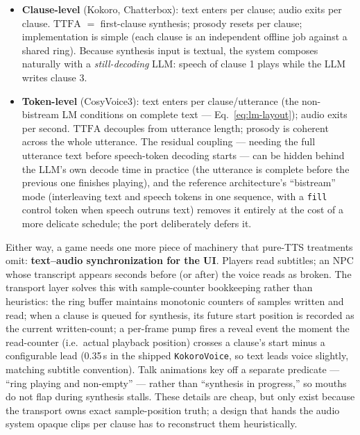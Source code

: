 \documentclass[11pt,a4paper]{article}
\newcommand{\TTFA}{\ensuremath{\mathrm{TTFA}}}
\newcommand{\code}[1]{\texttt{#1}}
\begin{document}
\begin{itemize}[leftmargin=2em]
\item \textbf{Clause-level} (Kokoro, Chatterbox): text enters per clause; audio exits
per clause. \TTFA{} $=$ first-clause synthesis; prosody resets per clause;
implementation is simple (each clause is an independent offline job against a shared
ring). Because synthesis input is textual, the system composes naturally with a
\emph{still-decoding} LLM: speech of clause 1 plays while the LLM writes clause 3.
\item \textbf{Token-level} (CosyVoice3): text enters per clause/utterance (the
non-bistream LM conditions on complete text --- Eq.~\ref{eq:lm-layout}); audio exits
per second. \TTFA{} decouples from utterance length; prosody is coherent across the
whole utterance. The residual coupling --- needing the full utterance text before
speech-token decoding starts --- can be hidden behind the LLM's own decode time in
practice (the utterance is complete before the previous one finishes playing), and the
reference architecture's ``bistream'' mode (interleaving text and speech tokens in one
sequence, with a \code{fill} control token when speech outruns text) removes it
entirely at the cost of a more delicate schedule; the port deliberately defers it.
\end{itemize}

Either way, a game needs one more piece of machinery that pure-TTS treatments omit:
\textbf{text--audio synchronization for the UI}. Players read subtitles; an NPC whose
transcript appears seconds before (or after) the voice reads as broken. The transport
layer solves this with sample-counter bookkeeping rather than heuristics: the ring
buffer maintains monotonic counters of samples written and read; when a clause is
queued for synthesis, its future start position is recorded as the current
written-count; a per-frame pump fires a reveal event the moment the read-counter
(i.e.\ actual playback position) crosses a clause's start minus a configurable lead
(0.35\,s in the shipped \code{KokoroVoice}, so text leads voice slightly, matching
subtitle convention). Talk animations key off a separate predicate --- ``ring playing
and non-empty'' --- rather than ``synthesis in progress,'' so mouths do not flap during
synthesis stalls. These details are cheap, but only exist because the transport owns
exact sample-position truth; a design that hands the audio system opaque clips per
clause has to reconstruct them heuristically.

\end{document}

